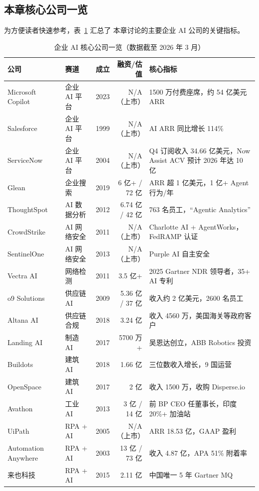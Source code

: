 \subsection{本章核心公司一览}

为方便读者快速参考，表~\ref{tab:enterprise-companies} 汇总了
本章讨论的主要企业 AI 公司的关键指标。

\begin{table}[htbp]
\centering
\caption{企业 AI 核心公司一览（数据截至 2026 年 3 月）}
\label{tab:enterprise-companies}
\footnotesize
\begin{tabularx}{\textwidth}{lllrX}
\toprule
\rowcolor{figLightGray}
\textbf{公司} & \textbf{赛道} & \textbf{成立} & \textbf{融资/估值} & \textbf{核心指标} \\
\midrule
Microsoft Copilot & 企业 AI 平台 & 2023 & N/A（上市） & 1500 万付费座席，约 54 亿美元 ARR \\
Salesforce & 企业 AI 平台 & 1999 & N/A（上市） & AI ARR 同比增长 114\% \\
ServiceNow & 企业 AI 平台 & 2004 & N/A（上市） & Q4 订阅收入 34.66 亿美元，Now Assist ACV 预计 2026 年达 10 亿 \\
Glean & 企业搜索 & 2019 & 6 亿+ / 72 亿 & ARR 超 1 亿美元，1 亿+ Agent 行为/年 \\
ThoughtSpot & AI 数据分析 & 2012 & 6.74 亿 / 42 亿 & 763 名员工，``Agentic Analytics'' \\
CrowdStrike & AI 网络安全 & 2011 & N/A（上市） & Charlotte AI + AgentWorks，FedRAMP 认证 \\
SentinelOne & AI 网络安全 & 2013 & N/A（上市） & Purple AI 自主安全 \\
Vectra AI & 网络检测 & 2011 & 3.5 亿+ & 2025 Gartner NDR 领导者，35+ AI 专利 \\
o9 Solutions & 供应链 AI & 2009 & 5.36 亿 / 37 亿 & 收入约 2 亿美元，2600 名员工 \\
Altana AI & 供应链合规 & 2018 & 3.24 亿 & 收入 4560 万，美国海关等政府客户 \\
Landing AI & 制造 AI & 2017 & 5700 万+ & 吴恩达创立，ABB Robotics 投资 \\
Buildots & 建筑 AI & 2018 & 1.66 亿 & 三位数收入增长，9 国运营 \\
OpenSpace & 建筑 AI & 2017 & 2 亿 & 收入 1500 万，收购 Disperse.io \\
Avathon & 工业 AI & 2013 & 3 亿 / 14 亿 & 前 BP CEO 任董事长，印度 20\%+ 加油站 \\
UiPath & RPA + AI & 2005 & N/A（上市） & ARR 18.53 亿，GAAP 盈利 \\
Automation Anywhere & RPA + AI & 2003 & 13 亿 / 73 亿 & 收入 4.87 亿，APA 51\% 附着率 \\
来也科技 & RPA + AI & 2015 & 2.11 亿 & 中国唯一 5 年 Gartner MQ \\
\bottomrule
\end{tabularx}
\end{table}

